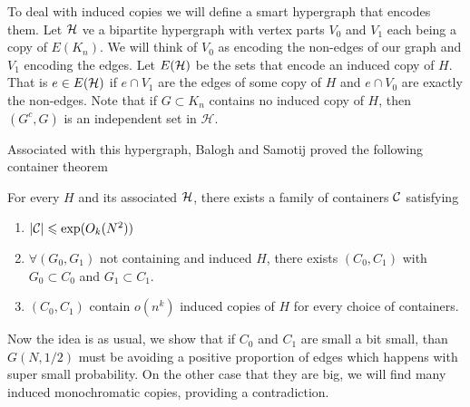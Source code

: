 To deal with induced copies we will define a smart hypergraph that
encodes them. Let $\mathcal{H}$ ve a bipartite hypergraph  with vertex parts
$V_0$ and $V_1$ each being a copy of $E(K_n)$.
We will think of $V_0$ as encoding the non-edges of our graph and
$V_1$ encoding the edges.
Let $E(\mathcal{H})$ be the sets that encode an induced copy of $H$. That is
$e \in E(\mathcal{H})$ if $e \cap V_1$ are the edges of some copy of $H$ and
$e \cap V_0$ are exactly the non-edges. Note that if $G \subset K_n$
contains no induced
copy of $H$, then $(G^c, G)$ is an independent set in $\mathcal{H}$.

Associated with this hypergraph, Balogh and Samotij proved the
following container theorem
\begin{theorem}
	For every $H$ and its associated $\mathcal{H}$, there exists a family of
	containers $\mathcal{C}$ satisfying
	\begin{enumerate}
		\item $|\mathcal{C}| \leqslant \exp(O_k(N^2))$
		\item $\forall (G_0, G_1)$ not containing and induced $H$, there
			exists $(C_0, C_1)$ with
			$G_0 \subset C_0$ and $G_1 \subset C_1$.
		\item $(C_0, C_1)$ contain $o(n^k)$ induced copies of $H$ for every
			choice of containers.
	\end{enumerate}
\end{theorem}

Now the idea is as usual, we show that if $C_0$ and $C_1$ are small a
bit small, than $G(N,1/2)$ must
be avoiding a positive proportion of edges which happens with super
small probability. On the other
case that they are big, we will find many induced monochromatic
copies, providing a contradiction.

